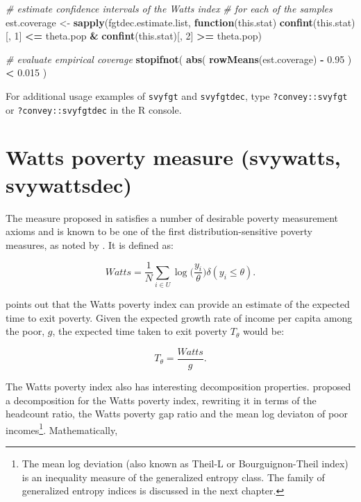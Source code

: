 \documentclass[
]{book}
\newenvironment{Shaded}{\begin{snugshade}}{\end{snugshade}}
\newcommand{\CommentTok}[1]{\textcolor[rgb]{0.56,0.35,0.01}{\textit{#1}}}
\newcommand{\ControlFlowTok}[1]{\textcolor[rgb]{0.13,0.29,0.53}{\textbf{#1}}}
\newcommand{\DecValTok}[1]{\textcolor[rgb]{0.00,0.00,0.81}{#1}}
\newcommand{\FloatTok}[1]{\textcolor[rgb]{0.00,0.00,0.81}{#1}}
\newcommand{\FunctionTok}[1]{\textcolor[rgb]{0.13,0.29,0.53}{\textbf{#1}}}
\newcommand{\NormalTok}[1]{#1}
\newcommand{\OtherTok}[1]{\textcolor[rgb]{0.56,0.35,0.01}{#1}}
\newcommand{\SpecialCharTok}[1]{\textcolor[rgb]{0.81,0.36,0.00}{\textbf{#1}}}
\begin{document}
\begin{Shaded}
\begin{Highlighting}[]
\CommentTok{\# estimate confidence intervals of the Watts index}
\CommentTok{\# for each of the samples}
\NormalTok{est.coverage }\OtherTok{\textless{}{-}}
  \FunctionTok{sapply}\NormalTok{(fgtdec.estimate.list, }\ControlFlowTok{function}\NormalTok{(this.stat)}
    \FunctionTok{confint}\NormalTok{(this.stat)[, }\DecValTok{1}\NormalTok{] }\SpecialCharTok{\textless{}=}\NormalTok{ theta.pop }\SpecialCharTok{\&}
      \FunctionTok{confint}\NormalTok{(this.stat)[, }\DecValTok{2}\NormalTok{] }\SpecialCharTok{\textgreater{}=}\NormalTok{ theta.pop)}

\CommentTok{\# evaluate empirical coverage}
\FunctionTok{stopifnot}\NormalTok{( }\FunctionTok{abs}\NormalTok{( }\FunctionTok{rowMeans}\NormalTok{(est.coverage) }\SpecialCharTok{{-}} \FloatTok{0.95}\NormalTok{ ) }\SpecialCharTok{\textless{}} \FloatTok{0.015}\NormalTok{ )}
\end{Highlighting}
\end{Shaded}

For additional usage examples of \texttt{svyfgt} and \texttt{svyfgtdec}, type \texttt{?convey::svyfgt} or \texttt{?convey::svyfgtdec} in the R console.

\hypertarget{watts-poverty-measure-svywatts-svywattsdec}{%
\section{Watts poverty measure (svywatts, svywattsdec)}\label{watts-poverty-measure-svywatts-svywattsdec}}

The measure proposed in \textcite{watts1968} satisfies a number of desirable poverty measurement axioms and is known to be one of the first distribution-sensitive poverty measures, as noted by \textcite{haughton2009}. It is defined as:

\[
Watts = \frac{1}{N} \sum_{i \in U} \log{ \bigg( \frac{y_i}{\theta} \bigg) \delta ( y_i \leqslant \theta) }.
\]

\textcite{murdoch1998} points out that the Watts poverty index can provide an estimate of the expected time to exit poverty. Given the expected growth rate of income per capita among the poor, \(g\), the expected time taken to exit poverty \(T_\theta\) would be:

\[
T_\theta = \frac{Watts}{g}.
\]

The Watts poverty index also has interesting decomposition properties. \textcite{blackburn1989} proposed a decomposition for the Watts poverty index, rewriting it in terms of the headcount ratio, the Watts poverty gap ratio and the mean log deviaton of poor incomes\footnote{The mean log deviation (also known as Theil-L or Bourguignon-Theil index) is an inequality measure of the generalized entropy class. The family of generalized entropy indices is discussed in the next chapter.}. Mathematically,
\end{document}
